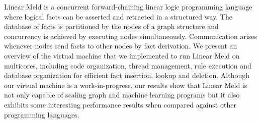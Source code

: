 Linear Meld is a concurrent forward-chaining linear logic programming language where logical facts can be asserted and
retracted in a structured way. The database of facts is partitioned by the nodes of a graph structure and concurrency is achieved by
executing nodes simultaneously. Communication arises whenever nodes send facts to other nodes by fact derivation.
We present an overview of the virtual machine that we implemented to run Linear Meld on multicores, including
code organization, thread management, rule execution and database organization for efficient fact insertion, lookup and deletion.
Although our virtual machine is a work-in-progress, our results show that Linear Meld is not only capable of scaling graph and machine
learning programs but it also exhibits some interesting performance results when compared against other programming languages.